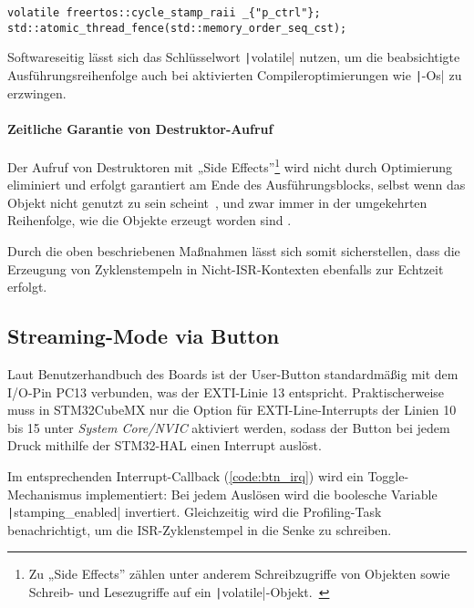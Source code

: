 \begin{code}
\begin{verbatim}
volatile freertos::cycle_stamp_raii _{"p_ctrl"};
std::atomic_thread_fence(std::memory_order_seq_cst);
\end{verbatim}
    \label{code:memory_barrier}
\end{code}

Softwareseitig lässt sich das Schlüsselwort \texttt|volatile| nutzen,
um die beabsichtigte Ausführungsreihenfolge auch bei aktivierten
Compileroptimierungen wie \texttt|-Os| zu erzwingen.

\paragraph{Zeitliche Garantie von Destruktor-Aufruf}

Der Aufruf von Destruktoren mit „Side Effects”\footnote{Zu „Side Effects” zählen
unter anderem Schreibzugriffe von Objekten sowie Schreib- und Lesezugriffe auf
ein \texttt|volatile|-Objekt.~\cite{cppreference_eval_order}} wird
nicht durch Optimierung eliminiert und erfolgt garantiert am Ende des
Ausführungsblocks, selbst wenn das Objekt nicht genutzt zu sein
scheint~\cite[§6.7.5.4 Abs. 3]{iso_iec_14882_2020}, und zwar immer in der
umgekehrten Reihenfolge, wie die Objekte erzeugt worden sind
\cite{isocpp_dtor_order}.

Durch die oben beschriebenen Maßnahmen lässt sich somit sicherstellen, dass die
Erzeugung von Zyklenstempeln in Nicht-ISR-Kontexten ebenfalls zur Echtzeit
erfolgt.

\subsection{Streaming-Mode via Button}

Laut Benutzerhandbuch des Boards ist der User-Button standardmäßig mit dem
I/O-Pin PC13 verbunden, was der \ac{EXTI}-Linie 13 entspricht. Praktischerweise
muss in STM32CubeMX nur die Option für EXTI-Line-Interrupts der Linien 10 bis 15
unter \textit{System Core/NVIC} aktiviert werden, sodass der Button bei jedem
Druck mithilfe der STM32-HAL einen Interrupt auslöst.

Im entsprechenden Interrupt-Callback (\ref{code:btn_irq}) wird ein
Toggle-Mechanismus implementiert: Bei jedem Auslösen wird die boolesche Variable
\texttt|stamping_enabled| invertiert. Gleichzeitig wird die
Profiling-Task benachrichtigt, um die ISR-Zyklenstempel in die Senke zu
schreiben.

